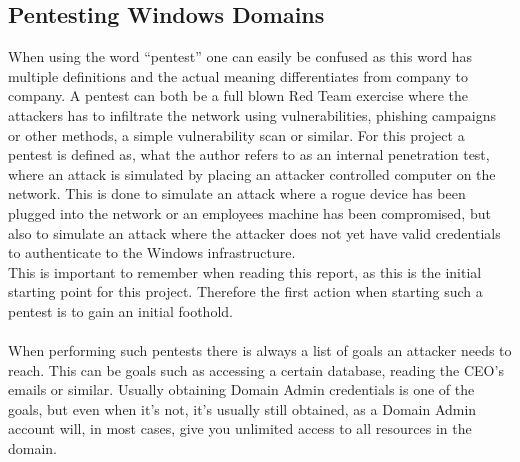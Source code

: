 \documentclass{article}
\begin{document}
\subsection{Pentesting Windows Domains}
When using the word \enquote{pentest} one can easily be confused as this word has multiple definitions and the actual meaning differentiates from company to company. A pentest can both be a full blown Red Team exercise where the attackers has to infiltrate the network using vulnerabilities, phishing campaigns or other methods, a simple vulnerability scan or similar. For this project a pentest is defined as, what the author refers to as an internal penetration test, where an attack is simulated by placing an attacker controlled computer on the network. This is done to simulate an attack where a rogue device has been plugged into the network or an employees machine has been compromised, but also to simulate an attack where the attacker does not yet have valid credentials to authenticate to the Windows infrastructure.
\\
This is important to remember when reading this report, as this is the initial starting point for this project. Therefore the first action when starting such a pentest is to gain an initial foothold.
\\\\
When performing such pentests there is always a list of goals an attacker needs to reach. This can be goals such as accessing a certain database, reading the CEO's emails or similar. Usually obtaining Domain Admin credentials is one of the goals, but even when it's not, it's usually still obtained, as a Domain Admin account will, in most cases, give you unlimited access to all resources in the domain.
\end{document}
